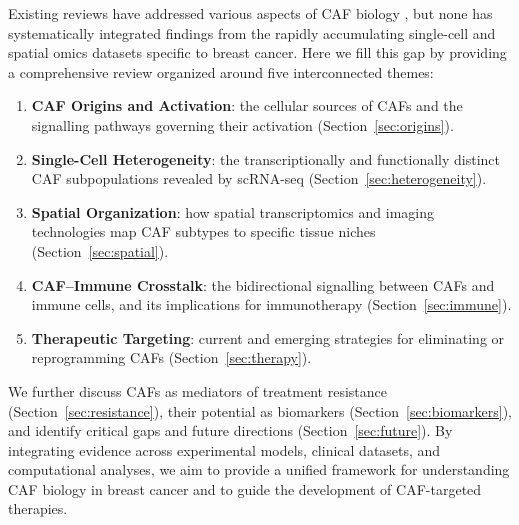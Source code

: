 Existing reviews have addressed various aspects of CAF biology \citep{kalluri2016biology, sahai2020framework, lavie2022cancer}, but none has systematically integrated findings from the rapidly accumulating single-cell and spatial omics datasets specific to breast cancer. Here we fill this gap by providing a comprehensive review organized around five interconnected themes:

\begin{enumerate}
  \item \textbf{CAF Origins and Activation}: the cellular sources of CAFs and the signalling pathways governing their activation (Section~\ref{sec:origins}).
  \item \textbf{Single-Cell Heterogeneity}: the transcriptionally and functionally distinct CAF subpopulations revealed by scRNA-seq (Section~\ref{sec:heterogeneity}).
  \item \textbf{Spatial Organization}: how spatial transcriptomics and imaging technologies map CAF subtypes to specific tissue niches (Section~\ref{sec:spatial}).
  \item \textbf{CAF--Immune Crosstalk}: the bidirectional signalling between CAFs and immune cells, and its implications for immunotherapy (Section~\ref{sec:immune}).
  \item \textbf{Therapeutic Targeting}: current and emerging strategies for eliminating or reprogramming CAFs (Section~\ref{sec:therapy}).
\end{enumerate}

We further discuss CAFs as mediators of treatment resistance (Section~\ref{sec:resistance}), their potential as biomarkers (Section~\ref{sec:biomarkers}), and identify critical gaps and future directions (Section~\ref{sec:future}). By integrating evidence across experimental models, clinical datasets, and computational analyses, we aim to provide a unified framework for understanding CAF biology in breast cancer and to guide the development of CAF-targeted therapies.
